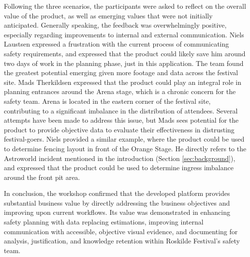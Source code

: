 Following the three scenarios, the participants were asked to reflect on the overall value of the product, as well as emerging values that were not initially anticipated. Generally speaking, the feedback was overwhelmingly positive, especially regarding improvements to internal and external communication. Niels Laustsen expressed a frustration with the current process of communicating safety requirements, and expressed that the product could likely save him around two days of work in the planning phase, just in this application. The team found the greatest potential emerging given more footage and data across the festival site. Mads Therkildsen expressed that the product could play an integral role in planning entrances around the Arena stage, which is a chronic concern for the safety team. Arena is located in the eastern corner of the festival site, contributing to a significant imbalance in the distribution of attendees. Several attempts have been made to address this issue, but Mads sees potential for the product to provide objective data to evaluate their effectiveness in distrusting festival-goers. Niels provided a similar example, where the product could be used to determine fencing layout in front of the Orange Stage. He directly refers to the Astroworld incident mentioned in the introduction (Section \ref{sec:background}), and expressed that the product could be used to determine ingress imbalance around the front pit area.

In conclusion, the workshop confirmed that the developed platform provides substantial business value by directly addressing the business objectives and improving upon current workflows. Its value was demonstrated in enhancing safety planning with data replacing estimations, improving internal communication with accessible, objective visual evidence, and documenting for analysis, justification, and knowledge retention within Roskilde Festival's safety team.